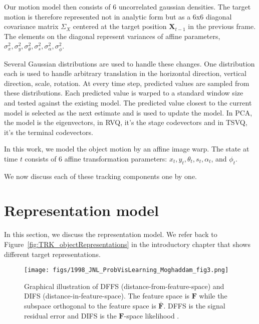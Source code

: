 Our motion model then consists of 6 uncorrelated gaussian densities. 
The target motion is therefore represented not in analytic form but as a 6x6 diagonal covariance matrix $\Sigma_X$ centered at the target position $\mathbf{X}_{t-1}$ in the previous frame.  The elements on the diagonal represent variances of affine parameters, $\sigma_x^2, \sigma_y^2, \sigma_\theta^2, \sigma_s^2, \sigma_\alpha^2, \sigma_\phi^2$.   


Several Gaussian distributions are used to handle these changes.  One distribution each is used to handle arbitrary translation in the horizontal direction, vertical direction, scale, rotation.  At every time step, predicted values are sampled from these distributions.  Each predicted value is warped to a standard window size and tested against the existing model.  The predicted value closest to the current model is selected as the next estimate and is used to update the model.  In PCA, the model is the eigenvectors, in RVQ, it's the stage codevectors and in TSVQ, it's the terminal codevectors.  

In this work, we model the object motion by an affine image warp.  The state at time $t$ consists of 6 affine transformation parameters: $x_t,  y_t, \theta_t, s_t, \alpha_t$, and $\phi_t$.


We now discuss each of these tracking components one by one.

\section{Representation model}
\label{Sec:Representation_model}
In this section, we discuss the representation model.  We refer back to Figure~\ref{fig:TRK_objectRepresentations} in the introductory chapter that shows different target representations.  




								\begin{figure}[t]
								\centering
								\texttt{[image: figs/1998\_JNL\_ProbVisLearning\_Moghaddam\_fig3.png]}
								\caption{Graphical illustration of DFFS (distance-from-feature-space) and DIFS (distance-in-feature-space).  The feature space is $\mathbf{F}$ while the subspace orthogonal to the feature space is $\bar{\mathbf{F}}$.  DFFS is the signal residual error and DIFS is the $\mathbf{F}$-space likelihood \cite{1997_JNL_EigenTRK_Moghaddam}.}
								\label{fig:1997_JNL_DIFSDFFS_Moghaddam}
								\end{figure}





